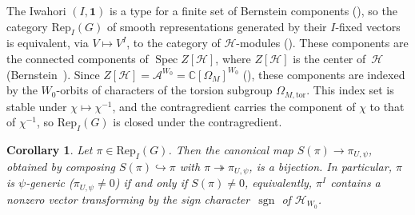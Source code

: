 \documentclass[11pt]{amsart}
\newtheorem{corollary}[theorem]{Corollary}
\theoremstyle{definition}
\theoremstyle{remark}
\DeclareMathOperator{\sgn}{sgn}
\newcommand{\CC}{\mathbb{C}}
\newcommand{\HH}{\mathcal{H}}
\newcommand{\AAA}{\mathcal{A}}
\begin{document}
The Iwahori $(I,\mathbf{1})$ is a type for a finite set of Bernstein components (\cite[Thm.~4.8]{Morris}), so the category $\mathrm{Rep}_I(G)$ of smooth representations generated by their $I$-fixed vectors is equivalent, via $V\mapsto V^I$, to the category of $\HH$-modules (\cite[Thm.~4.3(ii)]{BK}). These components are the connected components of $\operatorname{Spec} Z[\HH]$, where $Z[\HH]$ is the center of~$\HH$ (Bernstein~\cite{Bernstein}). Since $Z[\HH] = \AAA^{W_0} = \CC[\Omega_M]^{W_0}$ (\cite[\S 6]{Rostami}), these components are indexed by the $W_0$-orbits of characters of the torsion subgroup $\Omega_{M,\mathrm{tor}}$. This index set is stable under $\chi\mapsto\chi^{-1}$, and the
contragredient carries the component of $\chi$ to that of $\chi^{-1}$, so $\mathrm{Rep}_I(G)$ is closed under the
contragredient.

\begin{corollary}\label{cor:genericity}
Let $\pi\in\mathrm{Rep}_I(G)$. Then the canonical map $S(\pi) \to \pi_{U,\psi}$, obtained by composing $S(\pi)\hookrightarrow\pi$ with $\pi \twoheadrightarrow \pi_{U,\psi}$, is a bijection. In particular, $\pi$ is $\psi$-generic ($\pi_{U,\psi}\neq 0$) if and only if $S(\pi)\neq 0$, equivalently, $\pi^I$ contains a nonzero vector transforming by the sign character~$\sgn$ of $\HH_{W_0}$.
\end{corollary}
\end{document}
